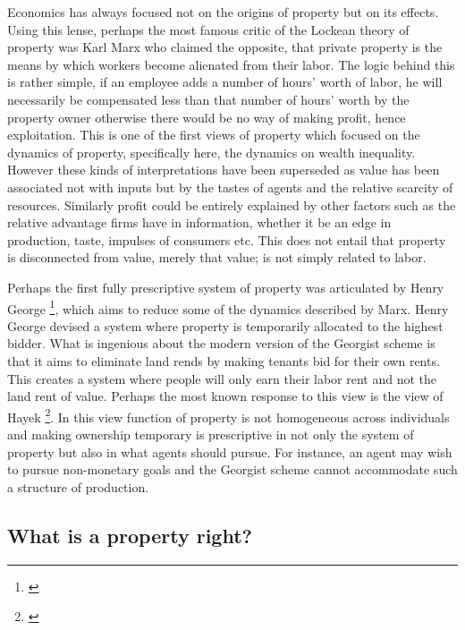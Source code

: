 \documentclass[12pt]{article}
\numberwithin{equation}{section}
\begin{document}
Economics has always focused not on the origins of property but on its effects. Using this lense, perhaps the most famous critic of the Lockean theory of property was Karl Marx who claimed the opposite, that private property is the means by which workers become alienated from their labor. The logic behind this is rather simple, if an employee adds a number of hours’ worth of labor, he will necessarily be compensated less than that number of hours’ worth by the property owner otherwise there would be no way of making profit, hence exploitation. This is one of the first views of property which focused on the dynamics of property, specifically here, the dynamics on wealth inequality. However these kinds of interpretations have been superseded as value has been associated not with inputs but by the tastes of agents and the relative scarcity of resources. Similarly profit could be entirely explained by other factors such as the relative advantage firms have in information, whether it be an edge in production, taste, impulses of consumers etc. This does not entail that property is disconnected from value, merely that value; is not simply related to labor.

Perhaps the first fully prescriptive system of property was articulated by Henry George \footnote{\cite{progress}}, which aims to reduce some of the dynamics described by Marx. Henry George devised a system where property is temporarily allocated to the highest bidder. What is ingenious about the modern version of the Georgist scheme is that it aims to eliminate land rends by making tenants bid for their own rents. This creates a system where people will only earn their labor rent and not the land rent of value. Perhaps the most known response to this view is the view of Hayek \footnote{\cite{Fatal}}. In this view function of property is not homogeneous across individuals and making ownership temporary is prescriptive in not only the system of property but also in what agents should pursue. For instance, an agent may wish to pursue non-monetary goals and the Georgist scheme cannot accommodate such a structure of production.


\newpage


\subsection{What is a property right?}
\end{document}
